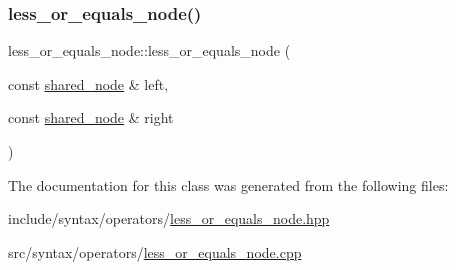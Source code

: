 \subsubsection{\texorpdfstring{less\+\_\+or\+\_\+equals\+\_\+node()}{less\_or\_equals\_node()}}
{\footnotesize\ttfamily less\+\_\+or\+\_\+equals\+\_\+node\+::less\+\_\+or\+\_\+equals\+\_\+node (\begin{DoxyParamCaption}\item[{const \hyperlink{namespacejawe_a3f307481d921b6cbb50cc8511fc2b544}{shared\+\_\+node} \&}]{left,  }\item[{const \hyperlink{namespacejawe_a3f307481d921b6cbb50cc8511fc2b544}{shared\+\_\+node} \&}]{right }\end{DoxyParamCaption})}



The documentation for this class was generated from the following files\+:\begin{DoxyCompactItemize}
\item 
include/syntax/operators/\hyperlink{less__or__equals__node_8hpp}{less\+\_\+or\+\_\+equals\+\_\+node.\+hpp}\item 
src/syntax/operators/\hyperlink{less__or__equals__node_8cpp}{less\+\_\+or\+\_\+equals\+\_\+node.\+cpp}\end{DoxyCompactItemize}

